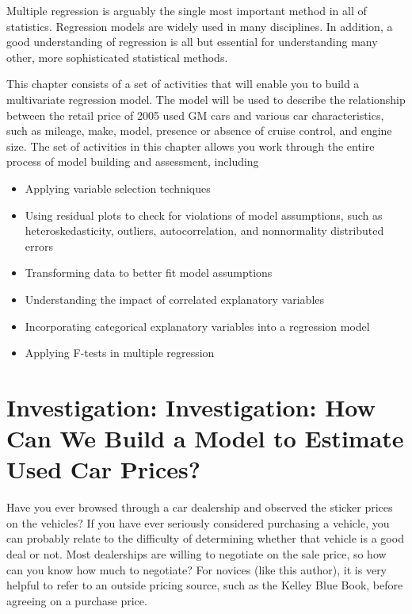 \documentclass[
]{report}
\providecommand{\tightlist}{%
  \setlength{\itemsep}{0pt}\setlength{\parskip}{0pt}}
\begin{document}
Multiple regression is arguably the single most important method in all of statistics.
Regression models are widely used in many disciplines. In addition, a good understanding
of regression is all but essential for understanding many other, more sophisticated
statistical methods.

This chapter consists of a set of activities that will enable you to build a multivariate
regression model. The model will be used to describe the relationship between the retail price of 2005 used GM cars and various car characteristics, such as mileage, make, model, presence or absence of cruise control, and engine size. The set of activities in this chapter allows you work through the entire process of model building and assessment, including

\begin{itemize}
\tightlist
\item
  Applying variable selection techniques
\item
  Using residual plots to check for violations of model assumptions, such as heteroskedasticity, outliers, autocorrelation, and nonnormality distributed errors
\item
  Transforming data to better fit model assumptions
\item
  Understanding the impact of correlated explanatory variables
\item
  Incorporating categorical explanatory variables into a regression model
\item
  Applying F-tests in multiple regression
\end{itemize}

\newpage

\section{Investigation: Investigation: How Can We Build a Model to Estimate Used Car Prices?}\label{investigation-investigation-how-can-we-build-a-model-to-estimate-used-car-prices}

Have you ever browsed through a car dealership and observed the sticker prices on the vehicles? If you have ever seriously considered purchasing a vehicle, you can probably relate to the difficulty of determining whether that vehicle is a good deal or not. Most dealerships are willing to negotiate on the sale price, so how can you know how much to negotiate? For novices (like this author), it is very helpful to refer to an outside
pricing source, such as the Kelley Blue Book, before agreeing on a purchase price.
\end{document}
